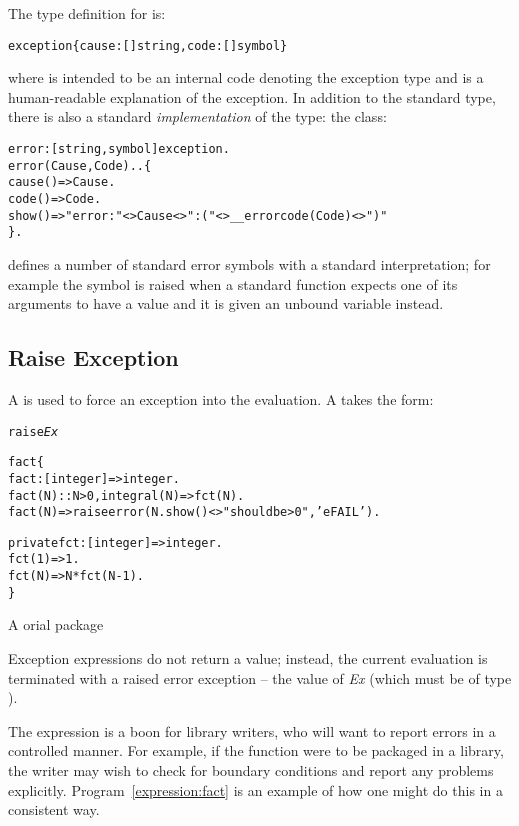 The type definition for  is:
\begin{alltt}
exception \impl{} \{ cause:[]\funarrow{}string, code:[]\funarrow{}symbol \}
\end{alltt}
where  is intended to be an internal code denoting the exception type and  is a human-readable explanation of the exception. In addition to the standard  type, there is also a standard \emph{implementation} of the  type: the  class:
\begin{alltt}
error:[string,symbol] \conarrow exception.
error(Cause,Code)..\{
  cause()=>Cause.
  code()=>Code.
  show()=>"error: "<>Cause<>": ("<>\_\_errorcode(Code)<>")"
\}.
\end{alltt}
\go defines a number of standard error symbols with a standard interpretation; for example the symbol  is raised when a standard function expects one of its arguments to have a value and it is given an unbound variable instead.

\subsection{Raise Exception}
\label{expression:exception}

A  is used to force an exception into the evaluation. A  takes the form:
\begin{alltt}
raise \emph{Ex}
\end{alltt}

\begin{program}[htb]
\vspace{0.5ex}
\begin{alltt}
fact\{
  fact:[integer]=>integer.
  fact(N)::N>0,integral(N) => fct(N).
  fact(N) => raise error(N.show()<>"should be >0",'eFAIL').
  
  private fct:[integer]=>integer.
    fct(1) => 1.
    fct(N) => N*fct(N-1).
\}
\end{alltt}
\vspace{-2ex}
\caption{A orial package}
\label{expression:fact}
\end{program}
Exception expressions do not return a value; instead, the current evaluation is terminated with a raised error exception -- the value of \emph{Ex} (which must be of type ).
\begin{aside}
The  expression is a boon for library writers, who will want to report errors in a controlled manner. For example, if the  function were to be packaged in a library, the writer may wish to check for boundary conditions and report any problems explicitly. Program~\vref{expression:fact} is an example of how one might do this in a consistent way.
\end{aside}



